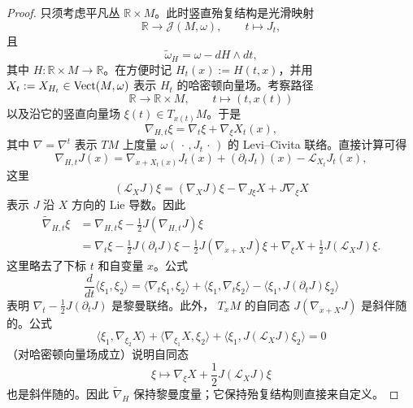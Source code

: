 \begin{proof}
只须考虑平凡丛 $\mathbb R\times M$。此时竖直殆复结构是光滑映射
\[
  \mathbb R\longrightarrow\mathcal J(M,\omega),
  \qquad t\longmapsto J_t,
\]
且
\[
  \widetilde\omega_H=\omega-dH\wedge dt,
\]
其中 $H:\mathbb R\times M\to\mathbb R$。在方便时记 $H_t(x):=H(t,x)$，并用
$X_t:=X_{H_t}\in\operatorname{Vect}(M,\omega)$ 表示 $H_t$ 的哈密顿向量场。考察路径
\[
  \mathbb R\longrightarrow\mathbb R\times M,
  \qquad t\longmapsto(t,x(t))
\]
以及沿它的竖直向量场 $\xi(t)\in T_{x(t)}M$。于是
\[
  \nabla_{H,t}\xi=\nabla_t\xi+\nabla_\xi X_t(x),
\]
其中 $\nabla=\nabla^t$ 表示 $TM$ 上度量 $\omega(\,\cdot\,,J_t\,\cdot\,)$ 的
Levi--Civita 联络。直接计算可得
\[
  \nabla_{H,t}J(x)
  =\nabla_{\dot x+X_t(x)}J_t(x)+(\partial_tJ_t)(x)
   -\mathcal L_{X_t}J_t(x),
\]
这里
\[
  (\mathcal L_XJ)\xi
  =(\nabla_XJ)\xi-\nabla_{J\xi}X+J\nabla_\xi X
\]
表示 $J$ 沿 $X$ 方向的 Lie 导数。因此
\begin{align*}
  \widetilde\nabla_{H,t}\xi
  &=\nabla_{H,t}\xi-\frac12J(\nabla_{H,t}J)\xi\\
  &=\nabla_t\xi-\frac12J(\partial_tJ)\xi
    -\frac12J(\nabla_{\dot x+X}J)\xi
    +\nabla_\xi X+\frac12J(\mathcal L_XJ)\xi.
\end{align*}
这里略去了下标 $t$ 和自变量 $x$。公式
\[
  \frac d{dt}\langle\xi_1,\xi_2\rangle
  =\langle\nabla_t\xi_1,\xi_2\rangle
   +\langle\xi_1,\nabla_t\xi_2\rangle
   -\langle\xi_1,J(\partial_tJ)\xi_2\rangle
\]
表明 $\nabla_t-\frac12J(\partial_tJ)$ 是黎曼联络。此外，
$T_xM$ 的自同态 $J(\nabla_{\dot x+X}J)$ 是斜伴随的。公式
\[
  \langle\xi_1,\nabla_{\xi_2}X\rangle
  +\langle\nabla_{\xi_1}X,\xi_2\rangle
  +\langle\xi_1,J(\mathcal L_XJ)\xi_2\rangle=0
\]
（对哈密顿向量场成立）说明自同态
\[
  \xi\longmapsto\nabla_\xi X+\frac12J(\mathcal L_XJ)\xi
\]
也是斜伴随的。因此 $\widetilde\nabla_H$ 保持黎曼度量；它保持殆复结构则直接来自定义。
\end{proof}

